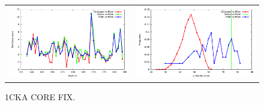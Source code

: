 \documentclass[a4paper,12pt]{article}
\begin{document}
   \begin{figure}[t]
     \centering
     \begin{tabular}{cc}
       \includegraphics[width=8.45cm]{1CKA_CORE_FIX_simil_bypos.pdf} &
       \includegraphics[width=8.45cm]{1CKA_CORE_FIX_simil_byseq.pdf} \\
     \end{tabular}
     \caption{1CKA CORE FIX.}
     \label{fig-seqlogo-T=03}
     
   \end{figure}



 
\end{document}

